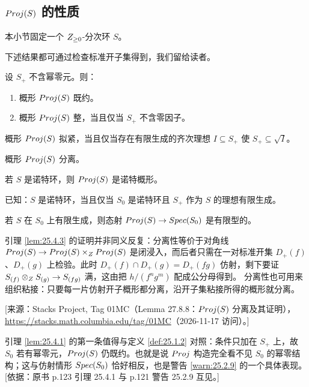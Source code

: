 \subsection{$Proj(S)$ 的性质}\label{sec:25.4}

本小节固定一个 $Z_{\ge 0}$-分次环 $S$。

下述结果都可通过检查标准开子集得到，我们留给读者。

\begin{lemma}\label{lem:25.4.1}
设 $S_+$ 不含幂零元。则：
\begin{enumerate}[label=(\arabic*),leftmargin=2.4em,itemsep=0.25ex]
  \item 概形 $Proj(S)$ 既约。
  \item 概形 $Proj(S)$ 整，当且仅当 $S_+$ 不含零因子。
\end{enumerate}
\end{lemma}

\begin{lemma}\label{lem:25.4.2}
概形 $Proj(S)$ 拟紧，当且仅当存在有限生成的齐次理想 $I \subseteq S_+$ 使 $S_+ \subseteq \sqrt{I}$。
\end{lemma}

\begin{lemma}\label{lem:25.4.3}
概形 $Proj(S)$ 分离。
\end{lemma}

\begin{lemma}\label{lem:25.4.4}
若 $S$ 是诺特环，则 $Proj(S)$ 是诺特概形。
\end{lemma}

\begin{remark}\label{rem:25.4.5}
已知：$S$ 是诺特环，当且仅当 $S_0$ 是诺特环且 $S_+$ 作为 $S$ 的理想有限生成。
\end{remark}

\begin{lemma}\label{lem:25.4.6}
若 $S$ 在 $S_0$ 上有限生成，则态射 $Proj(S) \to Spec(S_0)$ 是有限型的。
\end{lemma}

\begin{yizhu}
引理 \ref{lem:25.4.3} 的证明并非同义反复：分离性等价于对角线 $Proj(S) \to Proj(S) \times_Z Proj(S)$ 是闭浸入，而后者只需在一对标准开集 $D_+(f)$、$D_+(g)$ 上检验。此时 $D_+(f) \cap D_+(g) = D_+(fg)$ 仿射，剩下要证 $S_{(f)} \otimes_Z S_{(g)} \to S_{(fg)}$ 满，这由把 $h/(f^n g^m)$ 配成公分母得到。
分离性也可用来组织粘接：只要每一片仿射开子概形都分离，沿开子集粘接所得的概形就分离。

[来源：Stacks Project, Tag 01MC（Lemma 27.8.8：$Proj(S)$ 分离及其证明），\url{https://stacks.math.columbia.edu/tag/01MC}（2026-11-17 访问）。]
\end{yizhu}

\begin{yizhu}
引理 \ref{lem:25.4.1} 的第一条值得与定义 \ref{def:25.1.2} 对照：条件只加在 $S_+$ 上，故 $S_0$ 若有幂零元，$Proj(S)$ 仍既约。也就是说 $Proj$ 构造完全看不见 $S_0$ 的幂零结构；这与仿射情形 $Spec(S_0)$ 恰好相反，也是警告 \ref{warn:25.2.9} 的一个具体表现。
[依据：原书 p.123 引理 25.4.1 与 p.121 警告 25.2.9 互见。]
\end{yizhu}
